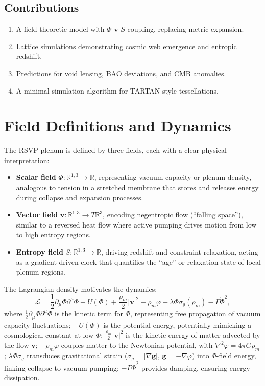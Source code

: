 \documentclass[11pt]{article}
\theoremstyle{plain}
\theoremstyle{definition}
\begin{document}
\subsection{Contributions}
\begin{enumerate}
    \item A field-theoretic model with $\Phi$-$\bm{v}$-$S$ coupling, replacing metric expansion.
    \item Lattice simulations demonstrating cosmic web emergence and entropic redshift.
    \item Predictions for void lensing, BAO deviations, and CMB anomalies.
    \item A minimal simulation algorithm for TARTAN-style tessellations.
\end{enumerate}

\section{Field Definitions and Dynamics}
The RSVP plenum is defined by three fields, each with a clear physical interpretation:
\begin{itemize}
    \item \textbf{Scalar field} $\Phi: \mathbb{R}^{1,3} \to \mathbb{R}$, representing vacuum capacity or plenum density, analogous to tension in a stretched membrane that stores and releases energy during collapse and expansion processes.
    \item \textbf{Vector field} $\bm{v}: \mathbb{R}^{1,3} \to T\mathbb{R}^3$, encoding negentropic flow (``falling space''), similar to a reversed heat flow where active pumping drives motion from low to high entropy regions.
    \item \textbf{Entropy field} $S: \mathbb{R}^{1,3} \to \mathbb{R}$, driving redshift and constraint relaxation, acting as a gradient-driven clock that quantifies the ``age'' or relaxation state of local plenum regions.
\end{itemize}
The Lagrangian density motivates the dynamics:
\begin{equation}
\mathcal{L} = \frac{1}{2} \partial_\mu \Phi \partial^\mu \Phi - U(\Phi) + \frac{\rho_m}{2} |\bm{v}|^2 - \rho_m \varphi + \lambda \Phi \sigma_g(\rho_m) - \Gamma \dot{\Phi}^2,
\label{eq:L}
\end{equation}
where $\frac{1}{2} \partial_\mu \Phi \partial^\mu \Phi$ is the kinetic term for $\Phi$, representing free propagation of vacuum capacity fluctuations; $-U(\Phi)$ is the potential energy, potentially mimicking a cosmological constant at low $\Phi$; $\frac{\rho_m}{2} |\bm{v}|^2$ is the kinetic energy of matter advected by the flow $\bm{v}$; $-\rho_m \varphi$ couples matter to the Newtonian potential, with $\nabla^2 \varphi = 4\pi G \rho_m$; $\lambda \Phi \sigma_g$ transduces gravitational strain ($\sigma_g = |\nabla \bm{g}|$, $\bm{g} = -\nabla \varphi$) into $\Phi$-field energy, linking collapse to vacuum pumping; $-\Gamma \dot{\Phi}^2$ provides damping, ensuring energy dissipation.
\end{document}
